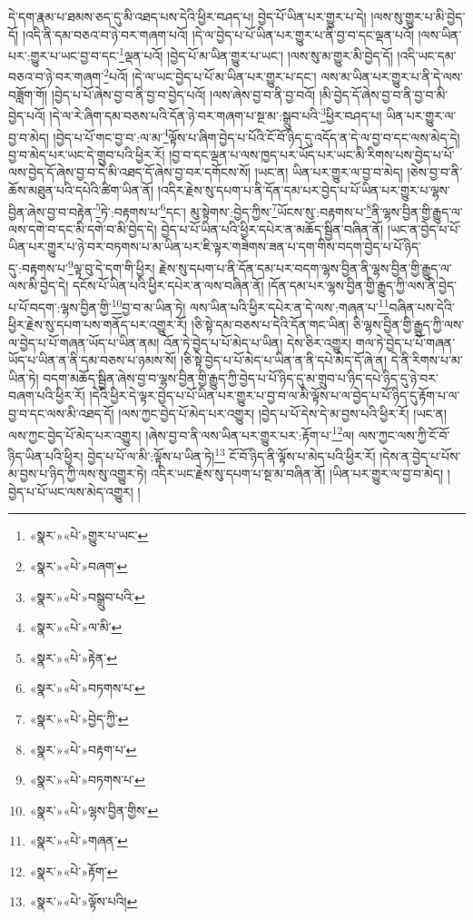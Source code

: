 དེ་དག་རྣམ་པ་ཐམས་ཅད་དུ་མི་འཐད་པས་དེའི་ཕྱིར་བཤད་པ། བྱེད་པོ་ཡིན་པར་གྱུར་པ་དེ། །ལས་སུ་གྱུར་པ་མི་བྱེད་དོ། །འདི་ནི་དམ་བཅའ་བ་ཉེ་བར་གཞག་པའོ། །དེ་ལ་བྱེད་པ་པོ་ཡིན་པར་གྱུར་པ་ནི་བྱ་བ་དང་ལྡན་པའོ། །ལས་ཡིན་པར་:གྱུར་པ་ཡང་བྱ་བ་དང་\footnote{«སྣར་»«པེ་»གྱུར་པ་ཡང་}ལྡན་པའོ། །བྱེད་པོ་མ་ཡིན་གྱུར་པ་ཡང་། །ལས་སུ་མ་གྱུར་མི་བྱེད་དོ། །འདི་ཡང་དམ་བཅའ་བ་ཉེ་བར་གཞག་\footnote{«སྣར་»«པེ་»བཞག་}པའོ། །དེ་ལ་ཡང་བྱེད་པ་པོ་མ་ཡིན་པར་གྱུར་པ་དང་། ལས་མ་ཡིན་པར་གྱུར་པ་ནི་དེ་ལས་བཟློག་གོ། །བྱེད་པ་པོ་ཞེས་བྱ་བ་ནི་བྱ་བ་བྱེད་པའོ། །ལས་ཞེས་བྱ་བ་ནི་བྱ་བའོ། །མི་བྱེད་དོ་ཞེས་བྱ་བ་ནི་བྱ་བ་མི་བྱེད་པའོ། །དེ་ལ་རེ་ཞིག་དམ་བཅས་པའི་དོན་ཉེ་བར་གཞག་པ་སྔ་མ་:སྒྲུབ་པའི་\footnote{«སྣར་»«པེ་»བསྒྲུབ་པའི་}ཕྱིར་བཤད་པ། ཡིན་པར་གྱུར་ལ་བྱ་བ་མེད། །བྱེད་པ་པོ་གང་བྱ་བ་:ལ་མ་\footnote{«སྣར་»«པེ་»ལ་མི་}ལྟོས་པ་ཞིག་བྱེད་པ་པོའི་ངོ་བོ་ཉིད་དུ་འདོད་ན་དེ་ལ་བྱ་བ་དང་ལས་མེད་དེ། བྱ་བ་མེད་པར་ཡང་དེ་གྲུབ་པའི་ཕྱིར་རོ། །བྱ་བ་དང་ལྡན་པ་ལས་ཁྱད་པར་ཡོད་པར་ཡང་མི་རིགས་པས་བྱེད་པ་པོ་ལས་བྱེད་དོ་ཞེས་བྱ་བ་དེ་མི་འཐད་དོ་ཞེས་བྱ་བར་དགོངས་སོ། །ཡང་ན། ཡིན་པར་གྱུར་ལ་བྱ་བ་མེད། །ཅེས་བྱ་བ་ནི་ཆོས་མཐུན་པའི་དཔེའི་ཚིག་ཡིན་ནོ། །འདིར་རྗེས་སུ་དཔག་པ་ནི་དོན་དམ་པར་བྱེད་པ་པོ་ཡིན་པར་གྱུར་པ་ལྷས་བྱིན་ཞེས་བྱ་བ་བརྟེན་\footnote{«སྣར་»«པེ་»རྟེན་}ཏེ་:བརྟགས་པ་\footnote{«སྣར་»«པེ་»བཏགས་པ་}དང་། མུ་སྟེགས་:བྱེད་ཀྱིས་\footnote{«སྣར་»«པེ་»བྱེད་ཀྱི་}ཡོངས་སུ་:བརྟགས་པ་\footnote{«སྣར་»«པེ་»བརྟག་པ་}ནི་ལྷས་བྱིན་གྱི་རྒྱུད་ལ་ལས་དགེ་བ་དང་མི་དགེ་བ་མི་བྱེད་དེ། བྱེད་པ་པོ་ཡིན་པའི་ཕྱིར་དཔེར་ན་མཆོད་སྦྱིན་བཞིན་ནོ། །ཡང་ན་བྱེད་པ་པོ་ཡིན་པར་གྱུར་པ་ཉེ་བར་བཏགས་པ་མ་ཡིན་པར་ཇི་ལྟར་གཟེགས་ཟན་པ་དག་གིས་བདག་བྱེད་པ་པོ་ཉིད་དུ་:བརྟགས་པ་\footnote{«སྣར་»«པེ་»བཏགས་པ་}ལྟ་བུ་དེ་དག་གི་ཕྱིར། རྗེས་སུ་དཔག་པ་ནི་དོན་དམ་པར་བདག་ལྷས་བྱིན་ནི་ལྷས་བྱིན་གྱི་རྒྱུད་ལ་ལས་མི་བྱེད་དེ། དངོས་པོ་ཡིན་པའི་ཕྱིར་དཔེར་ན་ལས་བཞིན་ནོ། །དོན་དམ་པར་ལྷས་བྱིན་གྱི་རྒྱུད་ཀྱི་ལས་ནི་བྱེད་པ་པོ་བདག་:ལྷས་བྱིན་གྱི་\footnote{«སྣར་»«པེ་»ལྷས་བྱིན་གྱིས་}བྱ་བ་མ་ཡིན་ཏེ། ལས་ཡིན་པའི་ཕྱིར་དཔེར་ན་དེ་ལས་:གཞན་པ་\footnote{«སྣར་»«པེ་»གཞན་}བཞིན་པས་དེའི་ཕྱིར་རྗེས་སུ་དཔག་པས་གནོད་པར་འགྱུར་རོ། །ཅི་སྟེ་དམ་བཅས་པ་དེའི་དོན་གང་ཡིན། ཅི་ལྷས་བྱིན་གྱི་རྒྱུད་ཀྱི་ལས་ལ་བྱེད་པ་པོ་གཞན་ཡོད་པ་ཡིན་ནམ། འོན་ཏེ་བྱེད་པ་པོ་མེད་པ་ཡིན། དེས་ཅིར་འགྱུར། གལ་ཏེ་བྱེད་པ་པོ་གཞན་ཡོད་པ་ཡིན་ན་ནི་དམ་བཅས་པ་ཉམས་སོ། །ཅི་སྟེ་བྱེད་པ་པོ་མེད་པ་ཡིན་ན་ནི་དཔེ་མེད་དོ་ཞེ་ན། དེ་ནི་རིགས་པ་མ་ཡིན་ཏེ། བདག་མཆོད་སྦྱིན་ཞེས་བྱ་བ་ལྷས་བྱིན་གྱི་རྒྱུད་ཀྱི་བྱེད་པ་པོ་ཉིད་དུ་མ་གྲུབ་པ་ཉིད་དཔེ་ཉིད་དུ་ཉེ་བར་བཞག་པའི་ཕྱིར་རོ། །དེའི་ཕྱིར་དེ་ལྟར་བྱེད་པ་པོ་ཡིན་པར་གྱུར་པ་བྱ་བ་ལ་མི་ལྟོས་པ་ལ་བྱེད་པ་པོ་ཉིད་དུ་རྟོག་པ་ལ་བྱ་བ་དང་ལས་མི་འཐད་དོ། །ལས་ཀྱང་བྱེད་པོ་མེད་པར་འགྱུར། །བྱེད་པ་པོ་དེས་དེ་མ་བྱས་པའི་ཕྱིར་རོ། །ཡང་ན། ལས་ཀྱང་བྱེད་པོ་མེད་པར་འགྱུར། །ཞེས་བྱ་བ་ནི་ལས་ཡིན་པར་གྱུར་པར་:རྟོག་པ་\footnote{«སྣར་»«པེ་»རྟོག་}ལ། ལས་ཀྱང་ལས་ཀྱི་ངོ་བོ་ཉིད་ཡིན་པའི་ཕྱིར། བྱེད་པ་པོ་ལ་མི་:ལྟོས་པ་ཡིན་ཏེ།\footnote{«སྣར་»«པེ་»ལྟོས་པའི།} ངོ་བོ་ཉིད་ནི་ལྟོས་པ་མེད་པའི་ཕྱིར་རོ། །དེས་ན་བྱེད་པ་པོས་མ་བྱས་པ་ཉིད་ཀྱི་ལས་སུ་འགྱུར་ཏེ། འདིར་ཡང་རྗེས་སུ་དཔག་པ་སྔ་མ་བཞིན་ནོ། །ཡིན་པར་གྱུར་ལ་བྱ་བ་མེད། །བྱེད་པ་པོ་ཡང་ལས་མེད་འགྱུར། །
